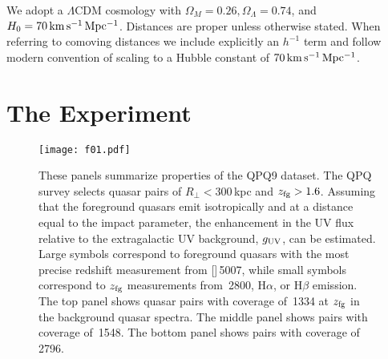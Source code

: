 \documentclass[iop]{emulateapj}
\begin{document}

We adopt a $\Lambda$CDM cosmology with $\Omega_M=0.26, \Omega_\Lambda=0.74$, and 
$H_0=70\,{\rm km\,s^{-1}\,Mpc^{-1}}$. Distances are proper unless otherwise stated. When referring 
to comoving distances we include explicitly an $h^{-1}$ term and follow modern convention of 
scaling to a Hubble constant of $70\,{\rm km\,s^{-1}\,Mpc^{-1}}$. 

\section{The Experiment}
\label{sec:experiment}

%


\begin{figure}
\texttt{[image: f01.pdf]}
\caption{These panels summarize properties of the QPQ9 dataset. The QPQ survey selects 
quasar pairs of $R_\perp < 300$\,kpc and $z_{\rm fg}>1.6$. Assuming that the foreground quasars 
emit isotropically and at a distance equal to the impact parameter, the enhancement in the UV 
flux relative to the extragalactic UV background, $g_{\rm UV}$, can be estimated. Large 
symbols correspond to foreground quasars with the most precise redshift measurement from 
[]\,5007, while small symbols correspond to $z_{\rm fg}$ 
measurements from \,2800, H$\alpha$, or H$\beta$ emission. The top panel shows 
quasar pairs with coverage of \,1334 at $z_{\rm fg}$ in the background quasar spectra. 
The middle panel shows pairs with coverage of \,1548. The bottom panel shows 
pairs with coverage of \,2796. 
}
\label{fig:experiment}
\end{figure}
\end{document}

